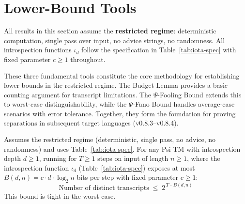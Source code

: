 
\section{Lower-Bound Tools}
\label{sec:lower-bound-tools}

\begin{remark}
All results in this section assume the \textbf{restricted regime}: deterministic computation, single pass over input, no advice strings, no randomness. All introspection functions $\iota_d$ follow the specification in Table~\ref{tab:iota-spec} with fixed parameter $c \geq 1$ throughout.
\end{remark}

These three fundamental tools constitute the core methodology for establishing lower bounds in the restricted regime. The Budget Lemma provides a basic counting argument for transcript limitations. The $\Psi$-Fooling Bound extends this to worst-case distinguishability, while the $\Psi$-Fano Bound handles average-case scenarios with error tolerance. Together, they form the foundation for proving separations in subsequent target languages (v0.8.3--v0.8.4).

\begin{lemma}
\label{lem:budget}\label{Lk:budget-lemma}\label{lemma:budget-9-2}
Assumes the restricted regime (deterministic, single pass, no advice, no randomness) and uses Table~\ref{tab:iota-spec}.
For any Psi-TM with introspection depth $d \geq 1$, running for $T \geq 1$ steps on input of length $n \geq 1$, where the introspection function $\iota_d$ (Table~\ref{tab:iota-spec}) exposes at most $B(d,n) = c \cdot d \cdot \log_{2} n$ bits per step with fixed parameter $c \geq 1$:
\begin{equation}
\label{eq:budget-bound}
\text{Number of distinct transcripts} \;\leq\; 2^{\,T\,\cdot\, B(d,n)}
\end{equation}
This bound is tight in the worst case.
\end{lemma}

